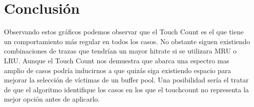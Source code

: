 \section{Conclusión}

Observando estos gráficos podemos observar que el Touch Count es el que tiene un comportamiento más regular en todos los casos. No obstante siguen existiendo combinaciones de trazas que tendrían un mayor hitrate si se utilizara MRU o LRU. Aunque el Touch Count nos demuestra que abarca una espectro mas amplio de casos podría inducirnos a que quizás siga existiendo espacio para mejorar la selección de
víctimas de un buffer pool. Una posibilidad sería el tratar de que el algoritmo identifique los casos en los que el touchcount no representa la mejor opción antes de aplicarlo.



